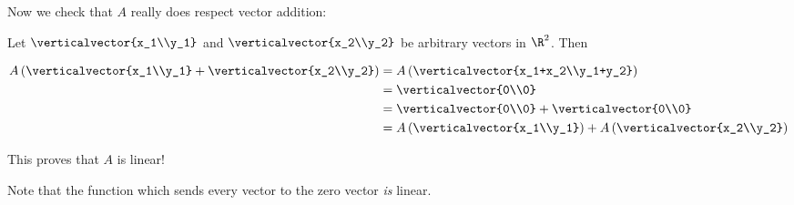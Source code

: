 \documentclass{ximera}
\begin{document}
\begin{question}
\begin{solution}
\begin{hint}
\begin{question}
        	 Now we check that $A$ really does respect vector addition:
		 
        	 Let $\verticalvector{x_1\\y_1}$ and $\verticalvector{x_2\\y_2}$ be arbitrary vectors in $\R^2$.  Then
		 
        	 \begin{align*}
        	 A\left( \verticalvector{x_1\\y_1}+\verticalvector{x_2\\y_2}\right) &= A\left( \verticalvector{x_1+x_2\\y_1+y_2}\right)\\
        	 	&=\verticalvector{0\\0}\\
        	 	&=\verticalvector{0\\0}+\verticalvector{0\\0}\\
        	 	&=A\left(\verticalvector{x_1\\y_1}\right)+A\left(\verticalvector{x_2\\y_2}\right)
        	 \end{align*}
		 
        	 This proves that $A$ is linear!
		
        \end{question}
	
    \end{hint}
    \begin{multiple-choice}
    \end{multiple-choice}
  \end{solution}

  \begin{warning}
    Note that the function which sends every vector to the zero vector
    \textit{is} linear.
  \end{warning}
\end{question}
	
\end{document}
